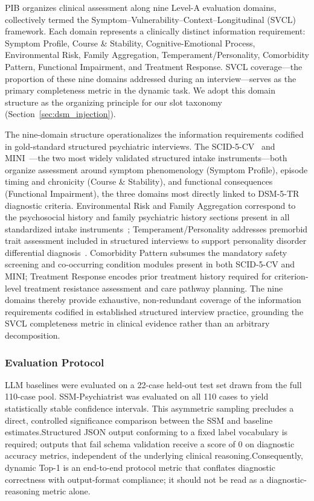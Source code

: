 \documentclass[conference]{IEEEtran}
\begin{document}
PIB organizes clinical assessment along nine Level-A evaluation domains, collectively termed the Symptom--Vulnerability--Context--Longitudinal (SVCL) framework. Each domain represents a clinically distinct information requirement: Symptom Profile, Course \& Stability, Cognitive-Emotional Process, Environmental Risk, Family Aggregation, Temperament/Personality, Comorbidity Pattern, Functional Impairment, and Treatment Response. SVCL coverage---the proportion of these nine domains addressed during an interview---serves as the primary completeness metric in the dynamic task. We adopt this domain structure as the organizing principle for our slot taxonomy (Section~\ref{sec:dsm_injection}).

The nine-domain structure operationalizes the information requirements codified in gold-standard structured psychiatric interviews. The SCID-5-CV~\cite{first2015structured} and MINI~\cite{sheehan1998mini}---the two most widely validated structured intake instruments---both organize assessment around symptom phenomenology (Symptom Profile), episode timing and chronicity (Course \& Stability), and functional consequences (Functional Impairment), the three domains most directly linked to DSM-5-TR diagnostic criteria. Environmental Risk and Family Aggregation correspond to the psychosocial history and family psychiatric history sections present in all standardized intake instruments~\cite{first2015structured,sheehan1998mini}; Temperament/Personality addresses premorbid trait assessment included in structured interviews to support personality disorder differential diagnosis~\cite{first2015structured}. Comorbidity Pattern subsumes the mandatory safety screening and co-occurring condition modules present in both SCID-5-CV and MINI; Treatment Response encodes prior treatment history required for criterion-level treatment resistance assessment and care pathway planning. The nine domains thereby provide exhaustive, non-redundant coverage of the information requirements codified in established structured interview practice, grounding the SVCL completeness metric in clinical evidence rather than an arbitrary decomposition.

\subsubsection{Evaluation Protocol}

LLM baselines were evaluated on a 22-case held-out test set drawn from the full 110-case pool. SSM-Psychiatrist was evaluated on all 110 cases to yield statistically stable confidence intervals. This asymmetric sampling precludes a direct, controlled significance comparison between the SSM and baseline estimates.Structured JSON output conforming to a fixed label vocabulary is required; outputs that fail schema validation receive a score of 0 on diagnostic accuracy metrics, independent of the underlying clinical reasoning.Consequently, dynamic Top-1 is an end-to-end protocol metric that conflates diagnostic correctness with output-format compliance; it should not be read as a diagnostic-reasoning metric alone.
\end{document}
